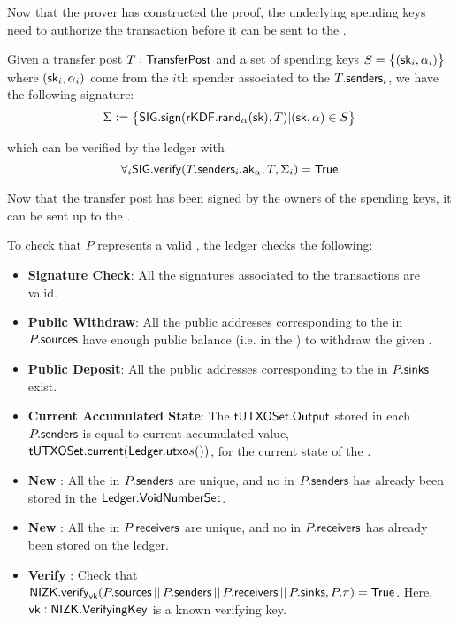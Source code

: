 Now that the prover has constructed the proof, the underlying spending keys need to authorize the transaction before it can be sent to the \Ledger{}.

\begin{definition}
    Given a transfer post $T: {\textsf{TransferPost}}{}$ and a set of spending keys $S = \set{({\textsf{sk}}_i, \alpha_i)}$ where $({\textsf{sk}}_i, \alpha_i)$ come from the $i$th spender associated to the $T.{\textsf{senders}}_i$, we have the following signature:
    \[\Sigma := \set{{\textsf{SIG}}.{\textsf{sign}}({\textsf{rKDF}}.{\textsf{rand}}_\alpha({\textsf{sk}}), T) | ({\textsf{sk}}, \alpha) \in S}\]

    which can be verified by the ledger with 
    \[\forall_i{\textsf{SIG}}.{\textsf{verify}}(T.{\textsf{senders}}_i.{\textsf{ak}}_\alpha, T, \Sigma_i) = {\textsf{True}}\]
\end{definition}

Now that the transfer post has been signed by the owners of the spending keys, it can be sent up to the \Ledger{}.

\begin{definition}
    To check that $P$ represents a valid \Transfer{}, the ledger checks the following:
    \begin{itemize}
        \item \textbf{Signature Check}: All the signatures associated to the transactions are valid.
        \item \textbf{Public Withdraw}: All the public addresses corresponding to the  in $P.{\textsf{sources}}$ have enough public balance (i.e. in the \PublicLedger{}) to withdraw the given \Asset{}.
        \item \textbf{Public Deposit}: All the public addresses corresponding to the  in $P.{\textsf{sinks}}$ exist.
        \item \textbf{Current Accumulated State}: The ${\textsf{tUTXOSet}}.{\textsf{Output}}$ stored in each $P.{\textsf{senders}}$ is equal to current accumulated value, ${\textsf{tUTXOSet}}.{\textsf{current}}({\textsf{Ledger}}.{\textsf{utxo}}{s}())$, for the current state of the \Ledger{}.
        \item \textbf{New }: All the  in $P.{\textsf{senders}}$ are unique, and no \VoidNumber{} in $P.{\textsf{senders}}$ has already been stored in the ${\textsf{Ledger}}.{\textsf{VoidNumberSet}}$.
        \item \textbf{New }: All the  in $P.{\textsf{receivers}}$ are unique, and no \UTXO{} in $P.{\textsf{receivers}}$ has already been stored on the ledger.
        \item \textbf{Verify \Transfer{}}: Check that ${\textsf{NIZK}}.{\textsf{verify}}_{\textsf{vk}}(P.{\textsf{sources}} \,||\, P.{\textsf{senders}} \,||\, P.{\textsf{receivers}} \,||\, P.{\textsf{sinks}}, P.\pi) = {\textsf{True}}$. Here, ${\textsf{vk}} : {\textsf{NIZK}}.{\textsf{VerifyingKey}}$ is a known verifying key.
    \end{itemize}
\end{definition}

